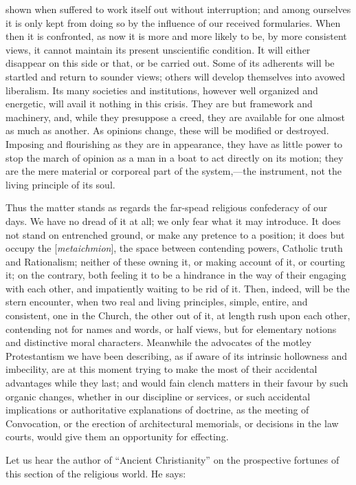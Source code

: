 shown when suffered to work itself out without interruption; and among
ourselves it is only kept from doing so by the influence of our
received formularies. When then it is confronted, as now it is more
and more likely to be, by more consistent views, it cannot maintain
its present unscientific condition. It will either disappear on this
side or that, or be carried out. Some of its adherents will be
startled and return to sounder views; others will develop themselves
into avowed liberalism. Its many societies and institutions, however
well organized and energetic, will avail it nothing in this crisis.
They are but framework and machinery, and, while they presuppose a
creed, they are available for one almost as much as another. As
opinions change, these will be modified or destroyed. Imposing and
flourishing as they are in appearance, they have as little power to
stop the march of opinion as a man in a boat to act directly on its
motion; they are the mere material or corporeal part of the
system,—the instrument, not the living principle of its soul.

Thus the matter stands as regards the far-spead
religious confederacy of our days. We have no dread of it at all; we
only fear what it may introduce. It does not stand on entrenched
ground, or make any pretence to a position; it does but occupy the [\emph{metaichmion}],
the space between contending powers, Catholic truth and Rationalism;
neither of these owning it, or making account of it, or courting it;
on the contrary, both feeling it to be a hindrance in the way of their
engaging with each other, and impatiently waiting to be rid of it.
Then, indeed, will be the stern encounter, when two real and living
principles, simple, entire, and consistent, one in the Church, the
other out of it, at length rush upon each other, contending not for
names and words, or half views, but for elementary notions and
distinctive moral characters. Meanwhile the advocates of the motley
Protestantism we have been describing, as if aware of its intrinsic
hollowness and imbecility, are at this moment trying to make the most
of their accidental advantages while they last; and would fain clench
matters in their favour by such organic changes, whether in our
discipline or services, or such accidental implications or
authoritative explanations of doctrine, as the meeting of Convocation,
or the erection of architectural memorials, or decisions in the law
courts, would give them an opportunity for effecting.

Let us hear the author of ``Ancient Christianity''
on the prospective fortunes of this section of the religious world. He
says:

